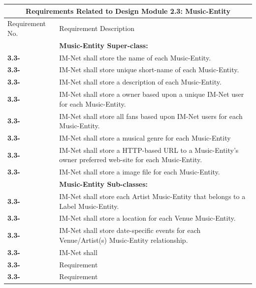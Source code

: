 \documentclass[letterpaper,12pt]{article}
\newcounter{rcounter}						%
\newcommand\rnumber{\stepcounter{rcounter}\arabic{rcounter}}
\begin{document}
{\setcounter{rcounter}{0}
\begin{center}
\begin{tabular}{|l|p{6in}|}
\hline 
\multicolumn{2}{|c|}{\textbf{Requirements Related to Design Module 2.3: Music-Entity}} \\ 
\hline 
Requirement No. & Requirement Description \\ 
\hline
& \textbf{Music-Entity Super-class:} \\
\hline
\textbf{3.3-\rnumber} & IM-Net shall store the name of each Music-Entity. \\ 
\hline
\textbf{3.3-\rnumber} & IM-Net shall store unique short-name of each Music-Entity. \\ 
\hline 
\textbf{3.3-\rnumber} & IM-Net shall store a description of each Music-Entity. \\ 
\hline 
\textbf{3.3-\rnumber} & IM-Net shall store a owner based upon a unique IM-Net user for each Music-Entity. \\ 
\hline 
\textbf{3.3-\rnumber} & IM-Net shall store all fans based upon IM-Net users for each Music-Entity. \\ 
\hline 
\textbf{3.3-\rnumber} & IM-Net shall store a musical genre for each Music-Entity \\ 
\hline 
\textbf{3.3-\rnumber} & IM-Net shall store a HTTP-based URL to a Music-Entity's owner preferred web-site for each Music-Entity. \\ 
\hline
\textbf{3.3-\rnumber} & IM-Net shall store a image file for each Music-Entity. \\ 
\hline
& \textbf{Music-Entity Sub-classes:} \\
\hline
\textbf{3.3-\rnumber} & IM-Net shall store each Artist Music-Entity that belongs to a Label Music-Entity. \\ 
\hline 
\textbf{3.3-\rnumber} & IM-Net shall store a location for each Venue Music-Entity. \\ 
\hline 
\textbf{3.3-\rnumber} & IM-Net shall store date-specific events for each Venue/Artist(s) Music-Entity relationship. \\ 
\hline
\textbf{3.3-\rnumber} & IM-Net shall  \\ 
\hline 
\textbf{3.3-\rnumber} & Requirement \\ 
\hline 
\textbf{3.3-\rnumber} & Requirement \\ 
\hline 

\end{tabular} 
\end{center}

}
\end{document}
